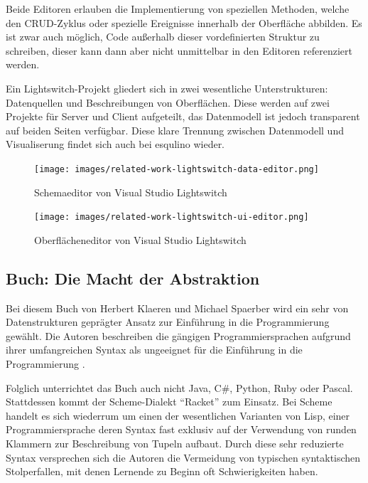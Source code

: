 Beide Editoren erlauben die Implementierung von speziellen Methoden, welche den CRUD-Zyklus oder spezielle Ereignisse innerhalb der Oberfläche abbilden. Es ist zwar auch möglich, Code außerhalb dieser vordefinierten Struktur zu schreiben, dieser kann dann aber nicht unmittelbar in den Editoren referenziert werden.

Ein Lightswitch-Projekt gliedert sich in zwei wesentliche Unterstrukturen: Datenquellen und Beschreibungen von Oberflächen. Diese werden auf zwei Projekte für Server und Client aufgeteilt, das Datenmodell ist jedoch transparent auf beiden Seiten verfügbar. Diese klare Trennung zwischen Datenmodell und Visualiserung findet sich auch bei esqulino wieder.

\begin{figure}[p]
  \centering \texttt{[image: images/related-work-lightswitch-data-editor.png]}
  \caption{Schemaeditor von Visual Studio Lightswitch}
  \label{fig:lightswitch-data-designer}
\end{figure}

\begin{figure}[p]
  \centering \texttt{[image: images/related-work-lightswitch-ui-editor.png]}
  \caption{Oberflächeneditor von Visual Studio Lightswitch}
  \label{fig:lightswitch-ui-designer}
\end{figure}

\subsection{Buch: Die Macht der Abstraktion}

Bei diesem Buch von Herbert Klaeren und Michael Spaerber wird ein sehr von Datenstrukturen geprägter Ansatz zur Einführung in die Programmierung gewählt. Die Autoren beschreiben die gängigen Programmiersprachen aufgrund ihrer umfangreichen Syntax als ungeeignet für die Einführung in die Programmierung \cite[2]{macht-der-abstraktion}. 

Folglich unterrichtet das Buch auch nicht Java, C\#, Python, Ruby oder Pascal. Stattdessen kommt der Scheme-Dialekt ``Racket'' zum Einsatz. Bei Scheme handelt es sich wiederrum um einen der wesentlichen Varianten von Lisp, einer Programmiersprache deren Syntax fast exklusiv auf der Verwendung von runden Klammern zur Beschreibung von Tupeln aufbaut. Durch diese sehr reduzierte Syntax versprechen sich die Autoren die Vermeidung von typischen syntaktischen Stolperfallen, mit denen Lernende zu Beginn oft Schwierigkeiten haben.

